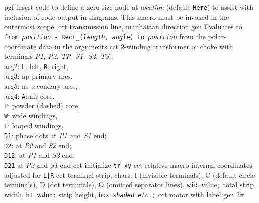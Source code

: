 %
  {pgf}%
  {insert \Tikz code to define a zero-size \Tikz node at {\sl location}%
    (default {\tt Here}) to assist with inclusion of \pic code output
    in \Tikz diagrams.  This macro must be invoked in the outermost
    \pic scope.  }%
%
  {cct}%
  {transmission line, manhattan direction}%
%
  {gen}%
  {Evaluates to {\tt from {\sl position} - Rect\_({\sl length, angle}) to
   {\sl position}} from the polar-coordinate data in the arguments }%
%
  {cct}%
  {2-winding transformer or choke with terminals {\sl P1, P2, TP, S1, S2, TS}:\\
    arg2: {\tt L}: left, {\tt R}: right,\\
    arg3: np primary arcs,\\
    arg5: ns secondary arcs,\\
    arg4:
    {\tt A}: air core,\\
    {\tt P}: powder (dashed) core,\\
    {\tt W}: wide windings,\\
    {\tt L}: looped windings,\\
    {\tt D1}: phase dots at {\sl P1} and {\sl S1} end;\\
    {\tt D2}: at {\sl P2} and {\sl S2} end;\\
    {\tt D12}: at {\sl P1} and {\sl S2} end;\\
    {\tt D21} at {\sl P2} and {\sl S1} end
   }%
%
  {cct}%
  {initialize {\tt tr\_xy}}%
%
  {cct}%
  {relative macro internal coordinates adjusted for {\tt L|R}}%
%
  {cct}%
  {terminal strip, chars:
   I (invisible terminals), C (default circle terminals), D (dot terminals),
   O (omitted separator lines), {\tt wid=}value{\tt ;} total strip width,
   {\tt ht=}value{\tt ;} strip height, {\tt box={\sl shaded etc.};}
    }%
%
  {cct}%
  {motor with label}%
%
  {gen}%
  {$2\pi$}%

%

